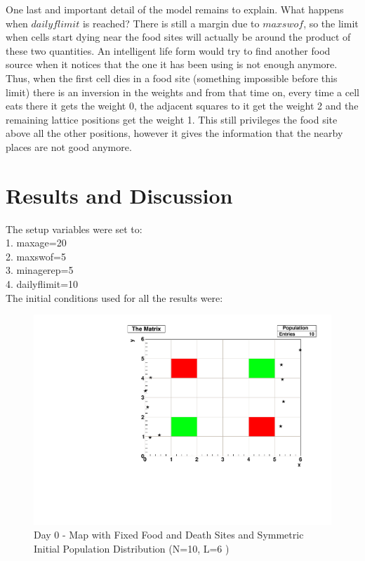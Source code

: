 \documentclass[a4paper,prd,twocolumn,nofootinbib,superscriptaddress,floatfix]{revtex4}
\begin{document}
One last and important detail of the model remains to explain. What happens when $dailyflimit$ is reached? There is still a margin due to $maxswof$, so the limit when cells start dying near the food sites will actually be around the product of these two quantities. An intelligent life form would try to find another food source when it notices that the one it has been using is not enough anymore. Thus, when the first cell dies in a food site (something impossible before this limit) there is an inversion in the weights and from that time on, every time a cell eats there it gets the weight 0, the adjacent squares to it get the weight 2 and the remaining lattice positions get the weight 1. This still privileges the food site above all the other positions, however it gives the information that the nearby places are not good anymore. 

 \section{Results and Discussion}
 The setup variables were set to:\\
1. maxage=20\\
2. maxswof=5\\
3. minagerep=5\\
4. dailyflimit=10   \\
The initial conditions used for all the results were:\\
 \begin{figure}[H]
\centering
  \includegraphics[scale=0.2]{a_0.pdf}
\caption{Day 0 - Map with Fixed Food and Death Sites and Symmetric Initial Population Distribution (N=10, L=6 ) }
  \label{fig:4}
\end{figure}
\end{document}
